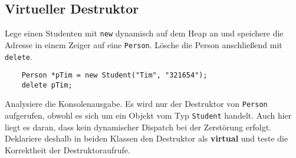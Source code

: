
\subsection{Virtueller Destruktor}
Lege einen Studenten mit \texttt{new} dynamisch auf dem Heap an und speichere die Adresse in einem Zeiger auf eine \texttt{Person}.
Lösche die Person anschließend mit \texttt{delete}.

\begin{lstlisting}
	Person *pTim = new Student("Tim", "321654");
	delete pTim;
\end{lstlisting}

Analysiere die Konsolenausgabe.
Es wird nur der Destruktor von \texttt{Person} aufgerufen, obwohl es sich um ein Objekt vom Typ \texttt{Student} handelt.
Auch hier liegt es daran, dass kein dynamischer Dispatch bei der Zerstörung erfolgt.
Deklariere deshalb in beiden Klassen den Destruktor als \textbf{virtual} und teste die Korrektheit der Destruktoraufrufe.

